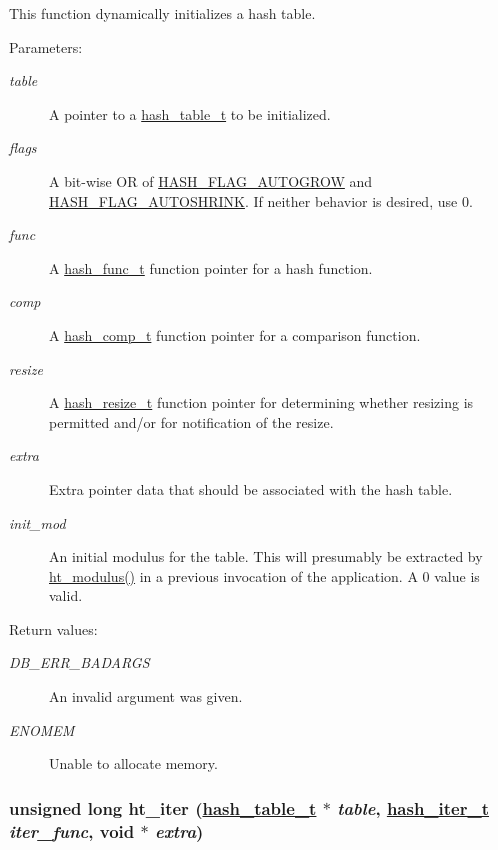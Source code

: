 This function dynamically initializes a hash table.\begin{Desc}
\item[Parameters: ]\par
\begin{description}
\item[{\em 
table}]A pointer to a \hyperlink{group__dbprim__hash_a0}{hash\_\-table\_\-t} to be initialized. \item[{\em 
flags}]A bit-wise OR of \hyperlink{group__dbprim__hash_a16}{HASH\_\-FLAG\_\-AUTOGROW} and \hyperlink{group__dbprim__hash_a17}{HASH\_\-FLAG\_\-AUTOSHRINK}. If neither behavior is desired, use 0. \item[{\em 
func}]A \hyperlink{group__dbprim__hash_a3}{hash\_\-func\_\-t} function pointer for a hash function. \item[{\em 
comp}]A \hyperlink{group__dbprim__hash_a4}{hash\_\-comp\_\-t} function pointer for a comparison function. \item[{\em 
resize}]A \hyperlink{group__dbprim__hash_a5}{hash\_\-resize\_\-t} function pointer for determining whether resizing is permitted and/or for notification of the resize. \item[{\em 
extra}]Extra pointer data that should be associated with the hash table. \item[{\em 
init\_\-mod}]An initial modulus for the table. This will presumably be extracted by \hyperlink{group__dbprim__hash_a22}{ht\_\-modulus()} in a previous invocation of the application. A 0 value is valid.\end{description}
\end{Desc}
\begin{Desc}
\item[Return values: ]\par
\begin{description}
\item[{\em 
DB\_\-ERR\_\-BADARGS}]An invalid argument was given. \item[{\em 
ENOMEM}]Unable to allocate memory. \end{description}
\end{Desc}
\hypertarget{group__dbprim__hash_a11}{
\subsubsection[ht\_\-iter]{\setlength{\rightskip}{0pt plus 5cm}unsigned long ht\_\-iter (\hyperlink{group__dbprim__hash_a0}{hash\_\-table\_\-t} $\ast$ {\em table}, \hyperlink{group__dbprim__hash_a2}{hash\_\-iter\_\-t} {\em iter\_\-func}, void $\ast$ {\em extra})}}
\label{group__dbprim__hash_a11}


